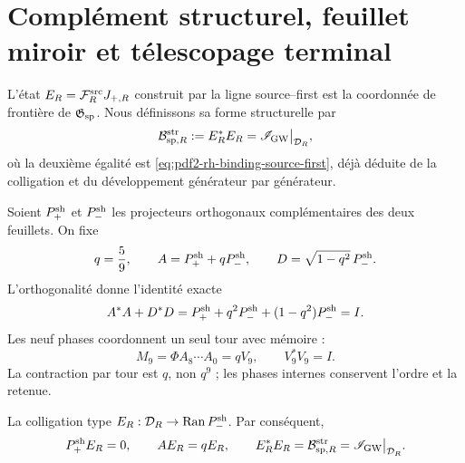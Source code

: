 \section{Complément structurel, feuillet miroir et télescopage terminal}

L'état \(E_R=\mathcal F_R^{\rm src}J_{+,R}\) construit par la ligne
source--first est la coordonnée de frontière de
\(\mathfrak G_{\rm sp}\). Nous définissons sa forme structurelle par
\begin{equation}\label{eq:pdf2-rh-bw-estructural}
 \mathcal B_{{\rm sp},R}^{\rm str}
 :=E_R^*E_R
 =\mathscr I_{\rm GW}\big|_{\mathcal D_R},
\end{equation}
où la deuxième égalité est
\eqref{eq:pdf2-rh-binding-source-first}, déjà déduite de la colligation et du
développement générateur par générateur.

Soient \(P_+^{\rm sh}\) et \(P_-^{\rm sh}\) les projecteurs orthogonaux
complémentaires des deux feuillets. On fixe
\begin{equation}\label{eq:pdf2-rh-q-a-d}
 q=\frac59,\qquad
 A=P_+^{\rm sh}+qP_-^{\rm sh},\qquad
 D=\sqrt{1-q^2}\,P_-^{\rm sh}.
\end{equation}
L'orthogonalité donne l'identité exacte
\begin{equation}\label{eq:pdf2-rh-conservacion-local}
 A^*A+D^*D
 =P_+^{\rm sh}+q^2P_-^{\rm sh}
 +(1-q^2)P_-^{\rm sh}=I.
\end{equation}
Les neuf phases coordonnent un seul tour avec mémoire :
\begin{equation}\label{eq:pdf2-rh-monodromia}
 M_9=\Phi A_8\cdots A_0=qV_9,
 \qquad V_9^*V_9=I.
\end{equation}
La contraction par tour est \(q\), non \(q^9\) ; les phases internes conservent
l'ordre et la retenue.

La colligation type
\(E_R:\mathcal D_R\to\operatorname{Ran}P_-^{\rm sh}\). Par conséquent,
\begin{equation}\label{eq:pdf2-rh-binding-espejo}
 P_+^{\rm sh}E_R=0,
 \qquad AE_R=qE_R,
 \qquad
 E_R^*E_R=\mathcal B_{{\rm sp},R}^{\rm str}
 =\mathscr I_{\rm GW}\big|_{\mathcal D_R}.
\end{equation}

